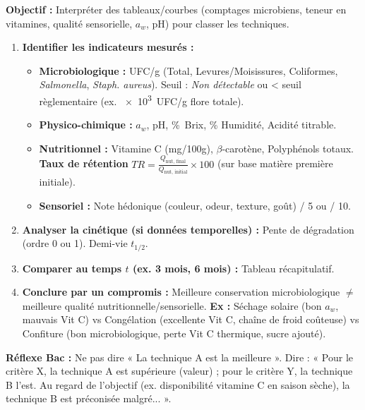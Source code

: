 \documentclass[11pt]{article}
\begin{document}
\begin{methode}
    \textbf{Objectif :} Interpréter des tableaux/courbes (comptages microbiens, teneur en vitamines, qualité sensorielle, $a_w$, pH) pour classer les techniques.
    \begin{enumerate}
        \item \textbf{Identifier les indicateurs mesurés :}
            \begin{itemize}
                \item \textbf{Microbiologique :} UFC/g (Total, Levures/Moisissures, Coliformes, \textit{Salmonella}, \textit{Staph. aureus}). Seuil : \emph{Non détectable} ou < seuil règlementaire (ex. \SI{e3}{UFC/g} flore totale).
                \item \textbf{Physico-chimique :} $a_w$, pH, \%\ Brix, \% Humidité, Acidité titrable.
                \item \textbf{Nutritionnel :} Vitamine C (mg/100g), $\beta$-carotène, Polyphénols totaux. \textbf{Taux de rétention} $TR = \frac{Q_{\text{nut, final}}}{Q_{\text{nut, initial}}} \times 100$ (sur base matière première initiale).
                \item \textbf{Sensoriel :} Note hédonique (couleur, odeur, texture, goût) / 5 ou / 10.
            \end{itemize}
        \item \textbf{Analyser la cinétique (si données temporelles) :} Pente de dégradation (ordre 0 ou 1). Demi-vie $t_{1/2}$.
        \item \textbf{Comparer au temps $t$ (ex. 3 mois, 6 mois) :} Tableau récapitulatif.
        \item \textbf{Conclure par un compromis :} Meilleure conservation microbiologique $\neq$ meilleure qualité nutritionnelle/sensorielle. \textbf{Ex :} Séchage solaire (bon $a_w$, mauvais Vit C) vs Congélation (excellente Vit C, chaîne de froid coûteuse) vs Confiture (bon microbiologique, perte Vit C thermique, sucre ajouté).
    \end{enumerate}
    \textbf{Réflexe Bac :} Ne pas dire « La technique A est la meilleure ». Dire : « Pour le critère X, la technique A est supérieure (valeur) ; pour le critère Y, la technique B l'est. Au regard de l'objectif (ex. disponibilité vitamine C en saison sèche), la technique B est préconisée malgré... ».
\end{methode}
\end{document}
